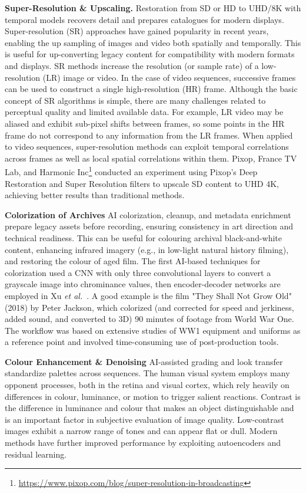\documentclass[sigconf,authorversion,review,authordraft]{webmedia}
\newcommand{\etal}[0]{\textit{et al.}~}
\begin{document}
\textbf{Super-Resolution \& Upscaling.}
Restoration from SD or HD to UHD/8K with temporal models recovers detail and prepares catalogues for modern displays. Super-resolution (SR) approaches have gained popularity in recent years\cite{he2023comparative}, enabling the up sampling of images and video both spatially and temporally. This is useful for up-converting legacy content for compatibility with modern formats and displays. SR methods increase the resolution (or sample rate) of a low-resolution (LR) image or video. In the case of video sequences, successive frames can be used to construct a single high-resolution (HR) frame. Although the basic concept of SR algorithms is simple, there are many challenges related to perceptual quality and limited available data. For example, LR video may be aliased and exhibit sub-pixel shifts between frames, so some points in the HR frame do not correspond to any information from the LR frames. When applied to video sequences, super-resolution methods can exploit temporal correlations across frames as well as local spatial correlations within them. Pixop, France TV Lab, and Harmonic Inc\footnote{\url{https://www.pixop.com/blog/super-resolution-in-broadcasting}} conducted an experiment using Pixop's Deep Restoration and Super Resolution filters to upscale SD content to UHD 4K, achieving better results than traditional methods.

\textbf{Colorization of Archives} AI colorization, cleanup, and metadata enrichment prepare legacy assets before recording, ensuring consistency in art direction and technical readiness.
This can be useful for colouring archival black-and-white content, enhancing infrared imagery (e.g., in low-light natural history filming), and restoring the colour of aged film. The first AI-based techniques for colorization used a CNN with only three convolutional layers to convert a grayscale image into chrominance values, then encoder-decoder networks are employed in Xu \etal\cite{xu2020stylization}. A good example is the film "They Shall Not Grow Old" (2018) by Peter Jackson, which colorized (and corrected for speed and jerkiness, added sound, and converted to 3D) 90 minutes of footage from World War One. The workflow was based on extensive studies of WW1 equipment and uniforms as a reference point and involved time-consuming use of post-production tools.

\textbf{Colour Enhancement \& Denoising} AI-assisted grading and look transfer standardize palettes across sequences. The human visual system employs many opponent processes, both in the retina and visual cortex, which rely heavily on differences in colour, luminance, or motion to trigger salient reactions. Contrast is the difference in luminance and colour that makes an object distinguishable and is an important factor in subjective evaluation of image quality. Low-contrast images exhibit a narrow range of tones and can appear flat or dull. Modern methods have further improved performance by exploiting autoencoders and residual learning\cite{lore2017llnet}.
\end{document}
